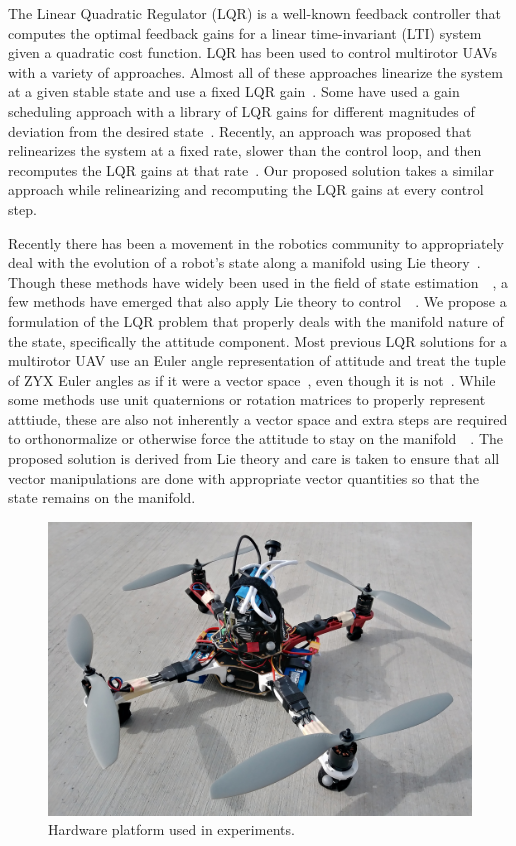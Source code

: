 

The Linear Quadratic Regulator (LQR) is a well-known feedback controller that
computes the optimal feedback gains for a linear time-invariant (LTI) system
given a quadratic cost function. LQR has been used to control multirotor UAVs with a variety of
approaches. Almost all of these approaches
linearize the system at a given stable state and use a fixed LQR
gain~\cite{cowling2007prototype}. Some have
used a gain scheduling approach with a library of LQR gains for different
magnitudes of deviation from the desired state~\cite{reyes2013lqr}. Recently, an approach was
proposed that relinearizes the system at a fixed rate, slower than the control
loop, and then recomputes the LQR gains at that rate~\cite{foehn2018onboard}. Our
proposed solution takes a similar approach while relinearizing and recomputing
the LQR gains at every control step. 

Recently there has been a movement in the robotics community to appropriately
deal with the evolution of a robot's state along a manifold using Lie
theory~\cite{sola2018micro}. Though these methods have widely been used in the
field of state estimation~\cite{sola2017quaternion}~\cite{koch2017relative}, a
few methods have emerged that also apply Lie theory to
control~\cite{yu2015high}~\cite{lee2010geometric}. We propose a formulation of
the LQR problem that properly deals with the manifold nature of the state,
specifically the attitude component. Most previous LQR solutions
for a multirotor UAV use an Euler angle representation of attitude and treat the
tuple of ZYX Euler angles as if it were a vector space~\cite{cowling2007prototype}, even
though it is not~\cite{diebel2006representing}. While some methods use unit
quaternions or rotation matrices to properly represent atttiude, these are also
not inherently a vector space and extra steps are required to orthonormalize or
otherwise force the attitude to stay on the
manifold~\cite{reyes2013lqr}~\cite{foehn2018onboard}. The proposed solution is
derived from Lie theory and care is taken to ensure that all vector
manipulations are done with
appropriate vector quantities so that the state remains on the manifold.

\begin{figure}
  \centering
  \includegraphics[scale=0.15]{figures/hardware_platform.jpg}
  \caption{Hardware platform used in experiments.}
  \label{f:drone_pic}
\end{figure}
